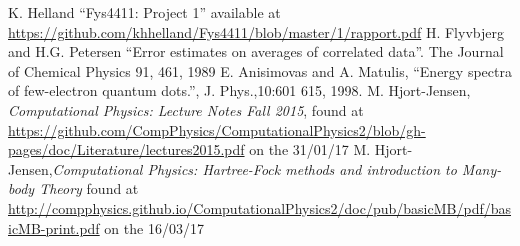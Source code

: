 \documentclass[a4paper,English,10pt]{article}
\begin{document}
\begin{thebibliography}{1}

  K. Helland ``Fys4411: Project 1'' available at \url{https://github.com/khhelland/Fys4411/blob/master/1/rapport.pdf}
  H. Flyvbjerg and H.G. Petersen ``Error estimates on averages of correlated data''. The Journal of Chemical Physics 91, 461, 1989
  E. Anisimovas and A. Matulis, ``Energy spectra of few-electron quantum dots.'', J. Phys.,10:601 615, 1998.
  M. Hjort-Jensen, \emph{Computational Physics: Lecture Notes Fall 2015}, found at
  \url{https://github.com/CompPhysics/ComputationalPhysics2/blob/gh-pages/doc/Literature/lectures2015.pdf}
  on the 31/01/17
  M. Hjort-Jensen,\emph{Computational Physics: Hartree-Fock methods and introduction to Many-body Theory}
  found at \url{http://compphysics.github.io/ComputationalPhysics2/doc/pub/basicMB/pdf/basicMB-print.pdf}
  on the 16/03/17
\end{thebibliography}


      
      




\end{document}
